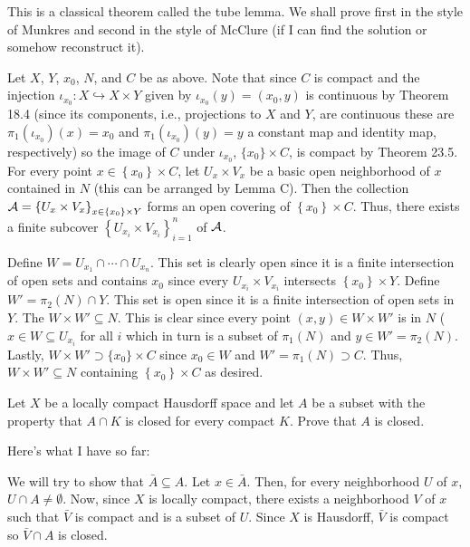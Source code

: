 \begin{solution}
  This is a classical theorem called the tube lemma. We shall prove first
  in the style of Munkres and second in the style of McClure (if I can find
  the solution or somehow reconstruct it).

  Let \(X\), \(Y\), \(x_0\), \(N\), and \(C\) be as above. Note that since
  \(C\) is compact and the injection
  \(\iota_{x_0}\colon X\hookrightarrow X\times Y\) given by
  \(\iota_{x_0}(y)=(x_0,y)\) is continuous by Theorem 18.4 (since its
  components, i.e., projections to \(X\) and \(Y\), are continuous these
  are \(\pi_1(\iota_{x_0})(x)=x_0\) and \(\pi_1(\iota_{x_0})(y)=y\) a
  constant map and identity map, respectively) so the image of \(C\) under
  \(\iota_{x_0}\), \(\{x_0\}\times C\), is compact by Theorem 23.5. For
  every point \(x\in\left\{x_0\right\}\times C\), let \(U_x\times V_x\) be
  a basic open neighborhood of \(x\) contained in \(N\) (this can be
  arranged by Lemma C). Then the collection
  \(\mathcal{A}=\left\{U_x\times V_x\right\}_{x\in\left\{x_0\right\}\times Y}\)
  forms an open covering of \(\left\{x_0\right\}\times C\). Thus, there
  exists a finite subcover \(\left\{U_{x_i}\times V_{x_i}\right\}_{i=1}^n\)
  of \(\mathcal{A}\).

  Define \(W= U_{x_1}\cap\dotsb\cap U_{x_n}\). This set is clearly open
  since it is a finite intersection of open sets and contains \(x_0\) since
  every \(U_{x_i}\times V_{x_i}\) intersects
  \(\left\{x_0\right\}\times Y\). Define \(W'=\pi_2(N)\cap Y\). This set is
  open since it is a finite intersection of open sets in \(Y\). The
  \(W\times W'\subseteq N\). This is clear since every point
  \((x,y)\in W\times W'\) is in \(N\) (\(x\in W\subseteq U_{x_i}\) for all
  \(i\) which in turn is a subset of \(\pi_1(N)\) and \(y\in
  W'=\pi_2(N)\). Lastly, \(W\times W'\supset \{x_0\}\times C\) since
  \(x_0\in W\) and \(W'=\pi_1(N)\supset C\). Thus,
  \(W\times W'\subseteq N\) containing \(\left\{x_0\right\}\times C\) as
  desired.
\end{solution}
\begin{problem}
  Let \(X\) be a locally compact Hausdorff space and let \(A\) be a subset
  with the property that \(A\cap K\) is closed for every compact
  \(K\). Prove that \(A\) is closed.
\end{problem}
\begin{solution}
  Here's what I have so far:

  We will try to show that \(\bar A\subseteq A\). Let \(x\in\bar A\). Then,
  for every neighborhood \(U\) of \(x\), \(U\cap A\neq\emptyset\). Now,
  since \(X\) is locally compact, there exists a neighborhood \(V\) of
  \(x\) such that \(\bar V\) is compact and is a subset of \(U\). Since
  \(X\) is Hausdorff, \(\bar V\) is compact so \(\bar V\cap A\) is closed.
\end{solution}
